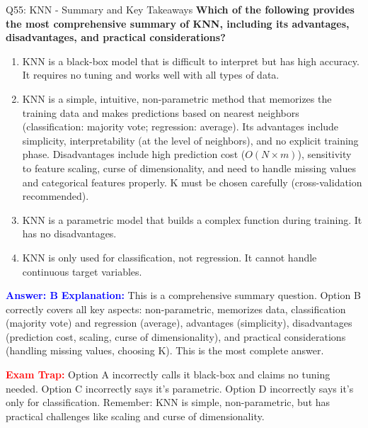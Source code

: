 \documentclass[8pt]{beamer}
\begin{document}
	\begin{frame}{Q55: KNN - Summary and Key Takeaways}
		\fontsize{6.5}{7.5}\selectfont
		\textbf{Which of the following provides the most comprehensive summary of KNN, including its advantages, disadvantages, and practical considerations?}
		
		\begin{enumerate}
			\item KNN is a black-box model that is difficult to interpret but has high accuracy. It requires no tuning and works well with all types of data.
			\item KNN is a simple, intuitive, non-parametric method that memorizes the training data and makes predictions based on nearest neighbors (classification: majority vote; regression: average). Its advantages include simplicity, interpretability (at the level of neighbors), and no explicit training phase. Disadvantages include high prediction cost ($O(N \times m)$), sensitivity to feature scaling, curse of dimensionality, and need to handle missing values and categorical features properly. K must be chosen carefully (cross-validation recommended).
			\item KNN is a parametric model that builds a complex function during training. It has no disadvantages.
			\item KNN is only used for classification, not regression. It cannot handle continuous target variables.
		\end{enumerate}
		
		\vspace{0.1cm}
		\textcolor{blue}{\textbf{Answer: B}}
		\vspace{0.1cm}
		\textcolor{blue}{\textbf{Explanation:}} This is a comprehensive summary question. Option B correctly covers all key aspects: non-parametric, memorizes data, classification (majority vote) and regression (average), advantages (simplicity), disadvantages (prediction cost, scaling, curse of dimensionality), and practical considerations (handling missing values, choosing K). This is the most complete answer.
		
		\textcolor{red}{\textbf{Exam Trap:}} Option A incorrectly calls it black-box and claims no tuning needed. Option C incorrectly says it's parametric. Option D incorrectly says it's only for classification. Remember: KNN is simple, non-parametric, but has practical challenges like scaling and curse of dimensionality.
	\end{frame}
	
	
\end{document}
